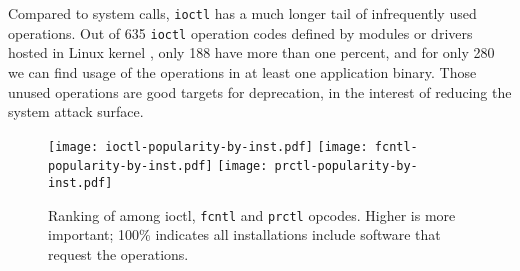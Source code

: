 




Compared to system calls, 
{\tt ioctl} has a much longer tail of infrequently used operations.
Out of 635 {\tt ioctl} operation codes defined by modules or drivers hosted in Linux kernel ,
only 188 have \usagemetric{} more than one percent,
and for only 280 we can find usage of the operations in at least one application binary.
Those unused operations are good targets for deprecation, in the interest
of reducing the system attack surface.


\begin{figure}[t]
\centering
\texttt{[image: ioctl-popularity-by-inst.pdf]}
\texttt{[image: fcntl-popularity-by-inst.pdf]}
\texttt{[image: prctl-popularity-by-inst.pdf]}
\caption{Ranking of \usagemetric{} among {ioctl}, {\tt fcntl} and {\tt prctl} opcodes.  Higher is more important; 100\% indicates all installations include software that request the operations.}
\label{fig:syspop:opcode-popularity}
\end{figure}



